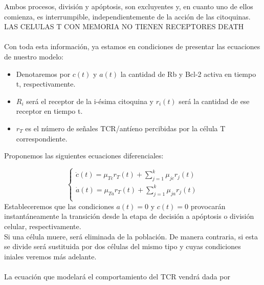\documentclass{article}
\begin{document}
	Ambos procesos, división y apóptosis, son excluyentes y, en cuanto uno de ellos comienza, es interrumpible, independientemente de la acción de las citoquinas. LAS CELULAS T CON MEMORIA NO TIENEN RECEPTORES DEATH
	\\
	\\
	Con toda esta información, ya estamos en condiciones de presentar las ecuaciones de nuestro modelo: 
	\begin{itemize}
	    \item Denotaremos por \textit{$c(t)$} y \textit{$a(t)$} la cantidad de Rb y Bcl-2 activa en tiempo t, respectivamente.
	    \item \textit{$R_{i}$} será el receptor de la i-ésima citoquina y \textit{$r_{i}(t)$} será la cantidad de ese receptor en tiempo t. 
	    \item $r_{T}$ es el número de señales TCR/antíeno  percibidas por la célula T correspondiente.
	\end{itemize} 
	 Proponemos las siguientes ecuaciones diferenciales:
	 
	 \begin{displaymath}
         \left\{ \begin{array}{l}
        \dot{c}(t) = \mu_{Tc}r_{T}(t) + \sum_{j=1}^{k}\mu_{jc}r_{j}(t)\\
        \dot{a}(t) = \mu_{Ta}r_{T}(t) + \sum_{j=1}^{k}\mu_{ja}r_{j}(t) \\
        \end{array}
        \right.
    \end{displaymath}
    Estableceremos que las condiciones $a(t)=0$ y $c(t)=0$ provocarán instantáneamente la transición desde la etapa de decisión a apóptosis o división celular, respectivamente.
	\\
	Si una célula muere, será eliminada de la población. De manera contraria, si esta se divide será sustituida por dos células del mismo tipo y cuyas condiciones iniales veremos más adelante.
	\\
	\\
	La ecuación que modelará el comportamiento del TCR vendrá dada por 
\end{document}
